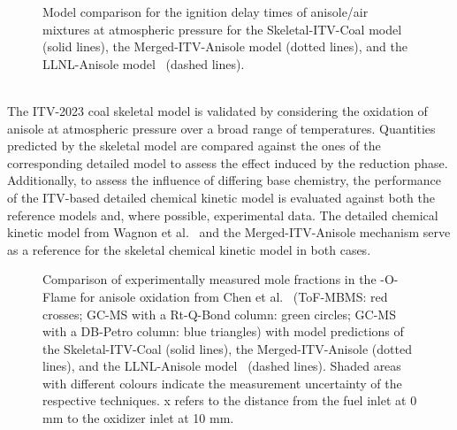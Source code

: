 \begin{refsection}
\begin{figure}[b]
  \centering
  \hfill
  \hfill
  \caption{Model comparison for the ignition delay times of anisole/air mixtures at atmospheric pressure for the Skeletal-ITV-Coal model (solid lines), the Merged-ITV-Anisole model (dotted lines), and the LLNL-Anisole model~\cite{Wagnon2018} (dashed lines).}
  \label{fig:B1bIDTAnisoleCoalMechanism}
\end{figure}
\\
The ITV-2023 coal skeletal model is validated by considering the oxidation of anisole at atmospheric pressure over a broad range of temperatures. Quantities predicted by the skeletal model are compared against the ones of the corresponding detailed model to assess the effect induced by the reduction phase. Additionally, to assess the influence of differing base chemistry, the performance of the ITV-based detailed chemical kinetic model is evaluated against both the reference models and, where possible, experimental data. The detailed chemical kinetic model from Wagnon et al.~\cite{Wagnon2018} and the Merged-ITV-Anisole mechanism serve as a reference for the skeletal chemical kinetic model in both cases.
\begin{figure}[t]
  \centering
  \hfill
  \hfill
  \caption{Comparison of experimentally measured mole fractions in the -O-Flame for anisole oxidation from Chen et al.~\cite{Chen2022} (ToF-MBMS: red crosses; GC-MS with a Rt-Q-Bond column: green circles; GC-MS with a DB-Petro column: blue triangles) with model predictions of the Skeletal-ITV-Coal (solid lines), the Merged-ITV-Anisole (dotted lines), and the LLNL-Anisole model~\cite{Wagnon2018} (dashed lines). Shaded areas with different colours indicate the measurement uncertainty of the respective techniques. x refers to the distance from the fuel inlet at 0 mm to the oxidizer inlet at 10 mm.}
  \label{fig:B1bAnisoleOxidationCoalMechanismCO2O}

\end{figure}
\end{refsection}
